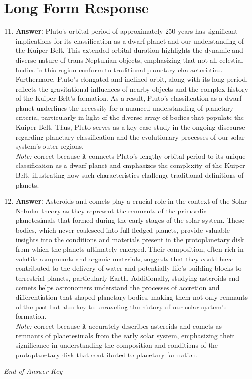 \documentclass[12pt]{article}
\begin{document}
\section*{Long Form Response}
\begin{enumerate}[label=\arabic*.]
\setcounter{enumi}{10}
\item \textbf{Answer:} Pluto's orbital period of approximately 250 years has significant implications for its classification as a dwarf planet and our understanding of the Kuiper Belt. This extended orbital duration highlights the dynamic and diverse nature of trans-Neptunian objects, emphasizing that not all celestial bodies in this region conform to traditional planetary characteristics. Furthermore, Pluto's elongated and inclined orbit, along with its long period, reflects the gravitational influences of nearby objects and the complex history of the Kuiper Belt's formation. As a result, Pluto's classification as a dwarf planet underlines the necessity for a nuanced understanding of planetary criteria, particularly in light of the diverse array of bodies that populate the Kuiper Belt. Thus, Pluto serves as a key case study in the ongoing discourse regarding planetary classification and the evolutionary processes of our solar system's outer regions.
\\ \textit{Note:} correct because it connects Pluto's lengthy orbital period to its unique classification as a dwarf planet and emphasizes the complexity of the Kuiper Belt, illustrating how such characteristics challenge traditional definitions of planets.
\item \textbf{Answer:} Asteroids and comets play a crucial role in the context of the Solar Nebular theory as they represent the remnants of the primordial planetesimals that formed during the early stages of the solar system. These bodies, which never coalesced into full-fledged planets, provide valuable insights into the conditions and materials present in the protoplanetary disk from which the planets ultimately emerged. Their composition, often rich in volatile compounds and organic materials, suggests that they could have contributed to the delivery of water and potentially life's building blocks to terrestrial planets, particularly Earth. Additionally, studying asteroids and comets helps astronomers understand the processes of accretion and differentiation that shaped planetary bodies, making them not only remnants of the past but also key to unraveling the history of our solar system's formation.
\\ \textit{Note:} correct because it accurately describes asteroids and comets as remnants of planetesimals from the early solar system, emphasizing their significance in understanding the composition and conditions of the protoplanetary disk that contributed to planetary formation.
\end{enumerate}

\vfill
\noindent\textit{End of Answer Key}
\end{document}
